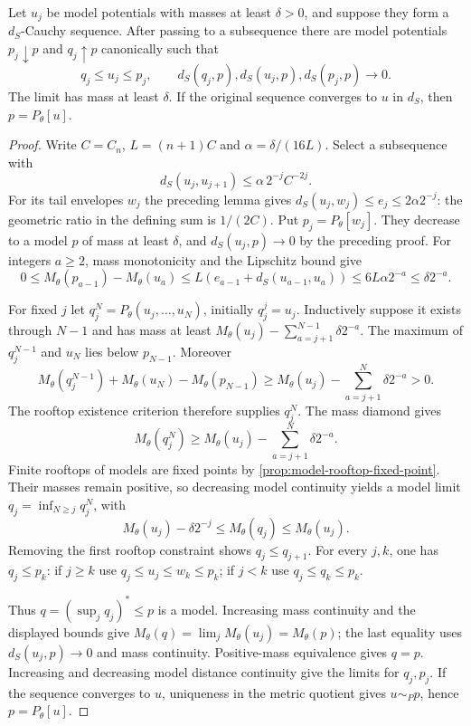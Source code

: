 \begin{proposition}\label{prop:singularity-monotone-model-brackets}
Let $u_j$ be model potentials with masses at least $\delta>0$, and suppose they form a $d_S$-Cauchy sequence. After passing to a subsequence there are model potentials $p_j\downarrow p$ and $q_j\uparrow p$ canonically such that
\[
 q_j\leq u_j\leq p_j,
 \qquad d_S(q_j,p),d_S(u_j,p),d_S(p_j,p)\longrightarrow0.
\]
The limit has mass at least $\delta$. If the original sequence converges to $u$ in $d_S$, then $p=P_\theta[u]$.
\end{proposition}
\begin{proof}
Write $C=C_n$, $L=(n+1)C$ and $\alpha=\delta/(16L)$. Select a subsequence with
\[
 d_S(u_j,u_{j+1})\leq\alpha\,2^{-j}C^{-2j}.
\]
For its tail envelopes $w_j$ the preceding lemma gives $d_S(u_j,w_j)\leq e_j\leq2\alpha2^{-j}$: the geometric ratio in the defining sum is $1/(2C)$. Put $p_j=P_\theta[w_j]$. They decrease to a model $p$ of mass at least $\delta$, and $d_S(u_j,p)\to0$ by the preceding proof. For integers $a\geq2$, mass monotonicity and the Lipschitz bound give
\[
 0\leq M_\theta(p_{a-1})-M_\theta(u_a)
 \leq L(e_{a-1}+d_S(u_{a-1},u_a))
 \leq6L\alpha2^{-a}\leq\delta2^{-a}.
\]

For fixed $j$ let $q_j^N=P_\theta(u_j,\ldots,u_N)$, initially $q_j^j=u_j$. Inductively suppose it exists through $N-1$ and has mass at least
$M_\theta(u_j)-\sum_{a=j+1}^{N-1}\delta2^{-a}$. The maximum of $q_j^{N-1}$ and $u_N$ lies below $p_{N-1}$. Moreover
\[
 M_\theta(q_j^{N-1})+M_\theta(u_N)-M_\theta(p_{N-1})
 \geq M_\theta(u_j)-\sum_{a=j+1}^{N}\delta2^{-a}>0.
\]
The rooftop existence criterion therefore supplies $q_j^N$. The mass diamond gives
\[
 M_\theta(q_j^N)\geq
                 M_\theta(u_j)-\sum_{a=j+1}^{N}\delta2^{-a}.
\]
Finite rooftops of models are fixed points by \cref{prop:model-rooftop-fixed-point}. Their masses remain positive, so decreasing model continuity yields a model limit $q_j=\inf_{N\geq j}q_j^N$, with
\[
 M_\theta(u_j)-\delta2^{-j}\leq M_\theta(q_j)\leq M_\theta(u_j).
\]
Removing the first rooftop constraint shows $q_j\leq q_{j+1}$. For every $j,k$, one has $q_j\leq p_k$: if $j\geq k$ use $q_j\leq u_j\leq w_k\leq p_k$; if $j<k$ use $q_j\leq q_k\leq p_k$.

Thus $q=(\sup_jq_j)^*\leq p$ is a model. Increasing mass continuity and the displayed bounds give $M_\theta(q)=\lim_jM_\theta(u_j)=M_\theta(p)$; the last equality uses $d_S(u_j,p)\to0$ and mass continuity. Positive-mass equivalence gives $q=p$. Increasing and decreasing model distance continuity give the limits for $q_j,p_j$. If the sequence converges to $u$, uniqueness in the metric quotient gives $u\sim_Pp$, hence $p=P_\theta[u]$.
\end{proof}

